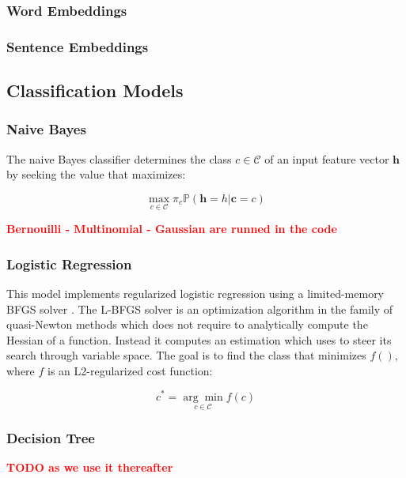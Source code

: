 \documentclass[letterpaper]{article}
\newcommand{\note}[1]{\textbf{\textcolor{red}{#1}}}
\begin{document}
\subsubsection{Word Embeddings}  \label{Word Embeddings}

\subsubsection{Sentence Embeddings}  \label{Sentence Embeddings}

\subsection{Classification Models}  \label{Classification}

\subsubsection{Naive Bayes}  \label{Naive Bayes}

The naive Bayes classifier determines the class $c \in \mathcal{C}$ of an input feature vector $\mathbf{h}$ by seeking the value that maximizes:

\begin{equation} \label{naive bayes eq}
	\underset{c \in \mathcal{C}}{\max} \pi_c \mathds{P} (\mathbf{h} = h | \mathbf{c} = c)
\end{equation}

\note{Bernouilli - Multinomial - Gaussian are runned in the code}

\subsubsection{Logistic Regression}  \label{Logistic Regression}

This model implements regularized logistic regression using a limited-memory BFGS solver \cite{liu1989limited}. The L-BFGS solver is an optimization algorithm in the family of quasi-Newton methods which does not require to analytically compute the Hessian of a function. Instead it computes an estimation which uses to steer its search through variable space. The goal is to find the class that minimizes $f()$, where $f$ is an L2-regularized cost function:

\begin{equation} \label{regression eq}
	c^* = \underset{c \in \mathcal{C}}{\arg \min} f(c) 
\end{equation}

\subsubsection{Decision Tree} \label{Decision Tree}
\note{TODO as we use it thereafter}
\end{document}
